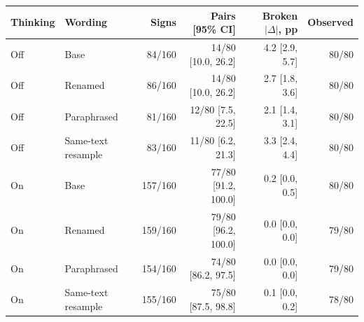 \begin{tabular}{llrrrr}
\toprule
Thinking & Wording & Signs & Pairs [95\% CI] & Broken $|\Delta|$, pp & Observed \\
\midrule
Off & Base & 84/160 & 14/80 [10.0, 26.2] & 4.2 [2.9, 5.7] & 80/80 \\
Off & Renamed & 86/160 & 14/80 [10.0, 26.2] & 2.7 [1.8, 3.6] & 80/80 \\
Off & Paraphrased & 81/160 & 12/80 [7.5, 22.5] & 2.1 [1.4, 3.1] & 80/80 \\
Off & Same-text resample & 83/160 & 11/80 [6.2, 21.3] & 3.3 [2.4, 4.4] & 80/80 \\
On & Base & 157/160 & 77/80 [91.2, 100.0] & 0.2 [0.0, 0.5] & 80/80 \\
On & Renamed & 159/160 & 79/80 [96.2, 100.0] & 0.0 [0.0, 0.0] & 79/80 \\
On & Paraphrased & 154/160 & 74/80 [86.2, 97.5] & 0.0 [0.0, 0.0] & 79/80 \\
On & Same-text resample & 155/160 & 75/80 [87.5, 98.8] & 0.1 [0.0, 0.2] & 78/80 \\
\bottomrule
\end{tabular}
